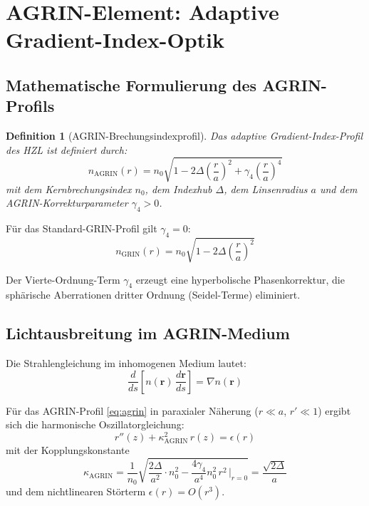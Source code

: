 ﻿\documentclass[12pt,a4paper]{article}
\newtheorem{definition}[theorem]{Definition}
\theoremstyle{definition}
\newcommand{\AGRIN}{\mathrm{AGRIN}}
\begin{document}
	\section{AGRIN-Element: Adaptive Gradient-Index-Optik}
	
	\subsection{Mathematische Formulierung des AGRIN-Profils}
	
	\begin{definition}[AGRIN-Brechungsindexprofil]
		Das adaptive Gradient-Index-Profil des HZL ist definiert durch:
		\begin{equation}
			n_\AGRIN(r) = n_0 \sqrt{1 - 2\Delta\!\left(\frac{r}{a}\right)^{\!2}
				+ \gamma_4\!\left(\frac{r}{a}\right)^{\!4}}
			\label{eq:agrin}
		\end{equation}
		mit dem Kernbrechungsindex $n_0$, dem Indexhub $\Delta$, dem Linsenradius $a$
		und dem AGRIN-Korrekturparameter $\gamma_4 > 0$.
	\end{definition}
	
	Für das Standard-GRIN-Profil gilt $\gamma_4 = 0$:
	\begin{equation}
		n_\mathrm{GRIN}(r) = n_0 \sqrt{1 - 2\Delta\!\left(\frac{r}{a}\right)^{\!2}}
	\end{equation}
	
	Der Vierte-Ordnung-Term $\gamma_4$ erzeugt eine hyperbolische Phasenkorrektur,
	die sphärische Aberrationen dritter Ordnung (Seidel-Terme) eliminiert.
	
	\subsection{Lichtausbreitung im AGRIN-Medium}
	
	Die Strahlengleichung im inhomogenen Medium lautet:
	\begin{equation}
		\frac{d}{ds}\!\left[n(\mathbf{r})\,\frac{d\mathbf{r}}{ds}\right]
		= \nabla n(\mathbf{r})
		\label{eq:ray_eikonal}
	\end{equation}
	
	Für das AGRIN-Profil \eqref{eq:agrin} in paraxialer Näherung
	($r \ll a$, $r' \ll 1$) ergibt sich die harmonische Oszillatorgleichung:
	\begin{equation}
		r''(z) + \kappa_\AGRIN^2\, r(z) = \epsilon(r)
		\label{eq:agrin_ode}
	\end{equation}
	mit der Kopplungskonstante
	\begin{equation}
		\kappa_\AGRIN = \frac{1}{n_0}\sqrt{\frac{2\Delta}{a^2}\cdot n_0^2
			- \frac{4\gamma_4}{a^4}n_0^2\, r^2\,\bigg|_{r=0}}
		= \frac{\sqrt{2\Delta}}{a}
		\label{eq:kappa}
	\end{equation}
	und dem nichtlinearen Störterm $\epsilon(r) = O(r^3)$.
	
\end{document}
